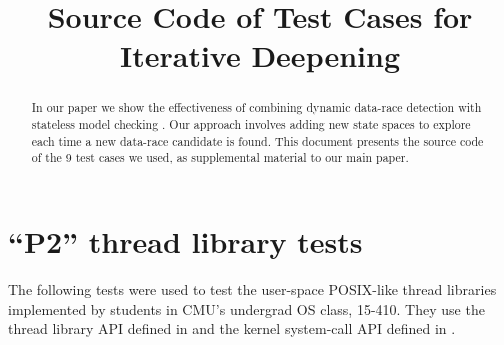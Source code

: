 \documentclass[pldi]{../sigplanconf-pldi15}
\begin{document}
%
%

\newcommand\quicksand{\textsc{Quicksand}}
\newcommand\simics{\textsc{Simics}}
\newcommand{\sect}[1]{\S #1}
\newcommand\hilight[2]{\color{#1}#2\color{black}}

\title{Source Code of Test Cases for Iterative Deepening}

\maketitle
\begin{abstract}
In our paper we show the effectiveness of combining dynamic data-race detection \cite{eraser,hybriddatarace} with stateless model checking \cite{verisoft,dpor}.
Our approach involves adding new state spaces to explore each time a new data-race candidate is found.
This document presents the source code of the 9 test cases we used, as supplemental material to our main paper.
\end{abstract}

\section{``P2'' thread library tests}

The following tests were used to test the user-space POSIX-like thread libraries implemented by students in CMU's undergrad OS class, 15-410.
They use the thread library API defined in \cite{thrlib} and the kernel system-call API defined in \cite{kspec}.
\end{document}
